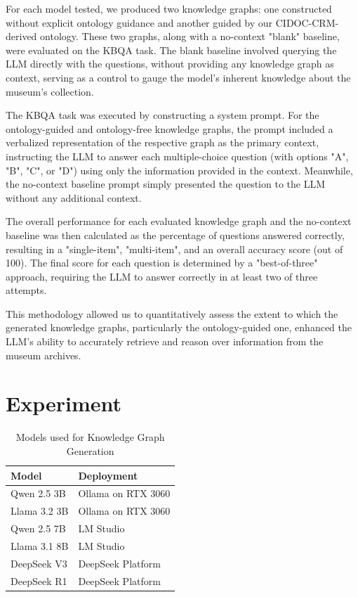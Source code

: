 \documentclass[a4, conference]{IEEEtran}
\begin{document}
For each model tested, we produced two knowledge graphs: one constructed without explicit ontology guidance and another guided by our CIDOC-CRM-derived ontology. These two graphs, along with a no-context "blank" baseline, were evaluated on the KBQA task. The blank baseline involved querying the LLM directly with the questions, without providing any knowledge graph as context, serving as a control to gauge the model's inherent knowledge about the museum's collection.

The KBQA task was executed by constructing a system prompt. For the ontology-guided and ontology-free knowledge graphs, the prompt included a verbalized representation of the respective graph as the primary context, instructing the LLM to answer each multiple-choice question (with options "A", "B", "C", or "D") using only the information provided in the context. Meanwhile, the no-context baseline prompt simply presented the question to the LLM without any additional context.

The overall performance for each evaluated knowledge graph and the no-context baseline was then calculated as the percentage of questions answered correctly, resulting in a "single-item", "multi-item", and an overall accuracy score (out of 100). The final score for each question is determined by a "best-of-three" approach, requiring the LLM to answer correctly in at least two of three attempts.

This methodology allowed us to quantitatively assess the extent to which the generated knowledge graphs, particularly the ontology-guided one, enhanced the LLM's ability to accurately retrieve and reason over information from the museum archives.

\section{Experiment}
\label{sec:experiment}

\begin{table}[h]
    \centering
    \caption{Models used for Knowledge Graph Generation} %
    \label{tab:model_deployment}
    \begin{tabular}{ll}
        \hline
        Model        & Deployment         \\
        \hline
        Qwen 2.5 3B  & Ollama on RTX 3060 \\
        Llama 3.2 3B & Ollama on RTX 3060 \\
        Qwen 2.5 7B  & LM Studio          \\
        Llama 3.1 8B & LM Studio          \\
        DeepSeek V3  & DeepSeek Platform  \\
        DeepSeek R1  & DeepSeek Platform  \\
        \hline
    \end{tabular}
\end{table}
\end{document}
